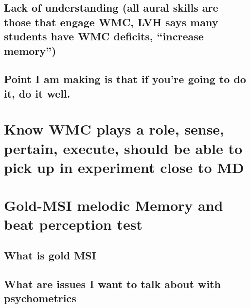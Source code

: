\documentclass[]{book}
\theoremstyle{definition}
\theoremstyle{definition}
\theoremstyle{definition}
\theoremstyle{remark}
\begin{document}
\hypertarget{lack-of-understanding-all-aural-skills-are-those-that-engage-wmc-lvh-says-many-students-have-wmc-deficits-increase-memory}{%
\subsection{Lack of understanding (all aural skills are those that
engage WMC, LVH says many students have WMC deficits, ``increase
memory'')}\label{lack-of-understanding-all-aural-skills-are-those-that-engage-wmc-lvh-says-many-students-have-wmc-deficits-increase-memory}}

\hypertarget{point-i-am-making-is-that-if-youre-going-to-do-it-do-it-well.}{%
\subsection{Point I am making is that if you're going to do it, do it
well.}\label{point-i-am-making-is-that-if-youre-going-to-do-it-do-it-well.}}

\hypertarget{know-wmc-plays-a-role-sense-pertain-execute-should-be-able-to-pick-up-in-experiment-close-to-md}{%
\section{Know WMC plays a role, sense, pertain, execute, should be able
to pick up in experiment close to
MD}\label{know-wmc-plays-a-role-sense-pertain-execute-should-be-able-to-pick-up-in-experiment-close-to-md}}

\hypertarget{gold-msi-melodic-memory-and-beat-perception-test}{%
\section{Gold-MSI melodic Memory and beat perception
test}\label{gold-msi-melodic-memory-and-beat-perception-test}}

\hypertarget{what-is-gold-msi}{%
\subsection{What is gold MSI}\label{what-is-gold-msi}}

\hypertarget{what-are-issues-i-want-to-talk-about-with-psychometrics}{%
\subsection{What are issues I want to talk about with
psychometrics}\label{what-are-issues-i-want-to-talk-about-with-psychometrics}}
\end{document}
